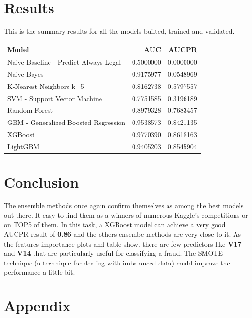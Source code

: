 \documentclass[]{article}
\begin{document}
\hypertarget{results}{%
\section{Results}\label{results}}

This is the summary results for all the models builted, trained and
validated.

\begin{table}[H]
\centering\begingroup\fontsize{10}{12}\selectfont

\begin{tabular}{l|r|r}
\hline
Model & AUC & AUCPR\\
\hline
Naive Baseline - Predict Always Legal & 0.5000000 & 0.0000000\\
\hline
Naive Bayes & 0.9175977 & 0.0548969\\
\hline
K-Nearest Neighbors k=5 & 0.8162738 & 0.5797557\\
\hline
SVM - Support Vector Machine & 0.7751585 & 0.3196189\\
\hline
Random Forest & 0.8979328 & 0.7683457\\
\hline
GBM - Generalized Boosted Regression & 0.9538573 & 0.8421135\\
\hline
XGBoost & 0.9770390 & 0.8618163\\
\hline
LightGBM & 0.9405203 & 0.8545904\\
\hline
\end{tabular}
\endgroup{}
\end{table}

\hypertarget{conclusion}{%
\section{Conclusion}\label{conclusion}}

The ensemble methods once again confirm themselves as among the best
models out there. It easy to find them as a winners of numerous Kaggle's
competitions or on TOP5 of them. In this task, a XGBoost model can
achieve a very good AUCPR result of \textbf{0.86} and the others ensembe
methods are very close to it. As the features importance plots and table
show, there are few predictors like \textbf{V17} and \textbf{V14} that
are particularly useful for classifying a fraud. The SMOTE technique (a
technique for dealing with imbalanced data) could improve the
performance a little bit.

\newpage

\hypertarget{appendix}{%
\section{Appendix}\label{appendix}}
\end{document}

